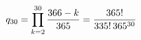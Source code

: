 \documentclass[preview]{standalone}
\begin{document}
\begin{align*}
\special{dvisvgm:raw <g id='unique000'>}q_{30}=\prod_{k=2}^{30}\frac{366-k}{365}=\frac{365!}{335!\,365^{30}}\special{dvisvgm:raw </g>}
\end{align*}
\end{document}

